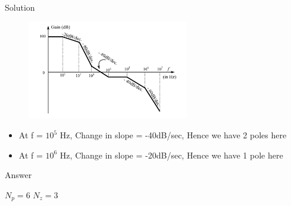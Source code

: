 \documentclass{beamer}
\begin{document}
\begin{frame}{Solution}
  \begin{figure}[htp]
    \centering
    \includegraphics[width=7cm]{figure}
    
    \label{fig:galaxy}
\end{figure}
\begin{itemize}

    \item At f = $10^{5}$ Hz, Change in slope = -40dB/sec, Hence we have 2 poles here
    \item At f = $10^{6}$ Hz, Change in slope = -20dB/sec, Hence we have 1 pole here
    
\end{itemize}
\end{frame}
\begin{frame}{Answer}
\huge

$N_{p} = 6$ \linebreak
$N_{z} = 3$  



    
\end{frame}
\end{document}
